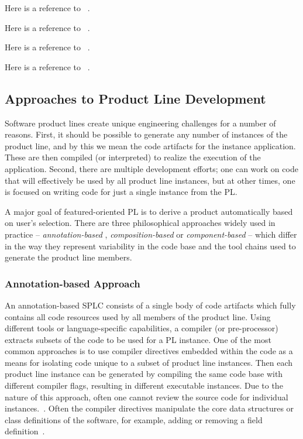 Here is a reference to ~\cite{Vasilevskiy:2016:TRP:2934466.2934484}.

Here is a reference to ~\cite{Kuhn:2015:CPC:2791060.2791092}.

Here is a reference to ~\cite{Schaefer:2010:DPS:1885639.1885647}.

Here is a reference to ~\cite{Apel:2008:AFF:1428476.1428480}.


\subsection{Approaches to Product Line Development}

Software product lines create unique engineering challenges for a number
of reasons. First, it should be possible to generate any number of
instances of the product line, and by this we mean the code artifacts
for the instance application. These are then compiled (or interpreted)
to realize the execution of the application. Second, there are multiple
development efforts; one can work on code that will effectively be used
by all product line instances, but at other times, one is focused on
writing code for just a single instance from the PL.

A major goal of featured-oriented PL is to derive a product
automatically based on user’s selection. There are three philosophical
approaches widely used in practice -- \textit{annotation-based} ,
\textit{composition-based} or \textit{component-based} -- which differ
in the way they represent variability in the code base and the tool
chains used to generate the product line members.

\subsubsection{Annotation-based Approach}

An annotation-based SPLC consists of a single body of code artifacts
which fully contains all code resources used by all members of the
product line. Using different tools or language-specific capabilities, a
compiler (or pre-processor) extracts subsets of the code to be used for
a PL instance. One of the most common approaches is to use compiler
directives embedded within the code as a means for isolating code unique
to a subset of product line instances. Then each product line instance
can be generated by compiling the same code base with different compiler
flags, resulting in different executable instances. Due to the nature of
this approach, often one cannot review the source code for individual
instances.~\cite{Apel:2013:FSP:2541773}. Often the compiler directives
manipulate the core data structures or class definitions of the
software, for example, adding or removing a field definition~\cite{Liebig:2010:AVF:1806799.1806819}.


